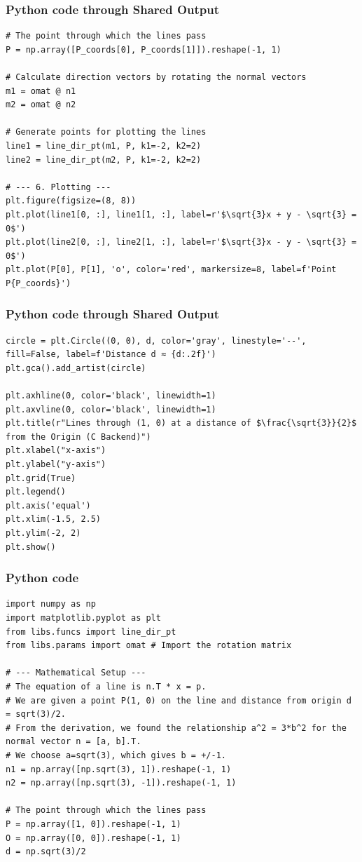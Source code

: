 \documentclass{beamer}
\begin{document}
\begin{frame}[fragile]
\frametitle{Python code through Shared Output }
\begin{lstlisting}
# The point through which the lines pass
P = np.array([P_coords[0], P_coords[1]]).reshape(-1, 1)

# Calculate direction vectors by rotating the normal vectors
m1 = omat @ n1
m2 = omat @ n2

# Generate points for plotting the lines
line1 = line_dir_pt(m1, P, k1=-2, k2=2)
line2 = line_dir_pt(m2, P, k1=-2, k2=2)

# --- 6. Plotting ---
plt.figure(figsize=(8, 8))
plt.plot(line1[0, :], line1[1, :], label=r'$\sqrt{3}x + y - \sqrt{3} = 0$')
plt.plot(line2[0, :], line2[1, :], label=r'$\sqrt{3}x - y - \sqrt{3} = 0$')
plt.plot(P[0], P[1], 'o', color='red', markersize=8, label=f'Point P{P_coords}')
\end{lstlisting}    
\end{frame}
\begin{frame}[fragile]
\frametitle{Python code through Shared Output }
\begin{lstlisting}
circle = plt.Circle((0, 0), d, color='gray', linestyle='--', fill=False, label=f'Distance d ≈ {d:.2f}')
plt.gca().add_artist(circle)

plt.axhline(0, color='black', linewidth=1)
plt.axvline(0, color='black', linewidth=1)
plt.title(r"Lines through (1, 0) at a distance of $\frac{\sqrt{3}}{2}$ from the Origin (C Backend)")
plt.xlabel("x-axis")
plt.ylabel("y-axis")
plt.grid(True)
plt.legend()
plt.axis('equal')
plt.xlim(-1.5, 2.5)
plt.ylim(-2, 2)
plt.show()
\end{lstlisting}    
\end{frame}
\begin{frame}[fragile]
\frametitle{Python code}
\begin{lstlisting}
import numpy as np
import matplotlib.pyplot as plt
from libs.funcs import line_dir_pt
from libs.params import omat # Import the rotation matrix

# --- Mathematical Setup ---
# The equation of a line is n.T * x = p.
# We are given a point P(1, 0) on the line and distance from origin d = sqrt(3)/2.
# From the derivation, we found the relationship a^2 = 3*b^2 for the normal vector n = [a, b].T.
# We choose a=sqrt(3), which gives b = +/-1.
n1 = np.array([np.sqrt(3), 1]).reshape(-1, 1)
n2 = np.array([np.sqrt(3), -1]).reshape(-1, 1)

# The point through which the lines pass
P = np.array([1, 0]).reshape(-1, 1)
O = np.array([0, 0]).reshape(-1, 1)
d = np.sqrt(3)/2
\end{lstlisting}    
\end{frame}
\end{document}
